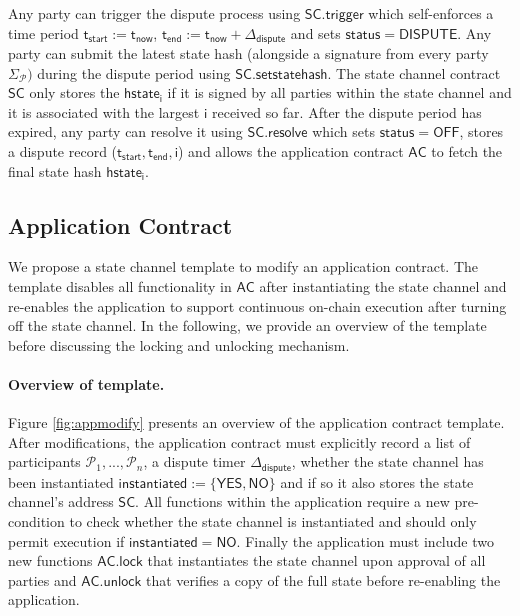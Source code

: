 \documentclass{llncs}
\newcommand{\instantiated}{\mathsf{instantiated}}
\newcommand{\instantiatedno}{\mathsf{NO}}
\newcommand{\instantiatedyes}{\mathsf{YES}}
\newcommand{\chanstatus}{\mathsf{status}}
\newcommand{\chandispute}{\mathsf{DISPUTE}}
\newcommand{\chanoff}{\mathsf{OFF}}
\newcommand{\hstatei}{\mathsf{hstate}_{\monotoniccounter}}
\newcommand{\monotoniccounter}{\mathsf{i}}
\newcommand{\participant}{\mathcal{P}}
\newcommand{\statechannel}{\mathsf{SC}}
\newcommand{\statechanneldispute}{\mathsf{SC}.\mathsf{trigger}}
\newcommand{\statechannelsetstate}{\mathsf{SC}.\mathsf{setstatehash}}
\newcommand{\statechannelresolve}{\mathsf{SC}.\mathsf{resolve}}
\newcommand{\appcontract}{\mathsf{AC}}
\newcommand{\applock}{\mathsf{AC.lock}}
\newcommand{\appunlock}{\mathsf{AC.unlock}}
\newcommand{\timerdispute}{\mathsf{\Delta}_{\mathsf{dispute}}}
\newcommand{\timenow}{\mathsf{t}_{\mathsf{now}}}
\newcommand{\timestart}{\mathsf{t}_{\mathsf{start}}}
\newcommand{\timeend}{\mathsf{t}_{\mathsf{end}}}
\newcommand{\timedispute}{\timenow + \mathsf{\Delta}_{\mathsf{dispute}}}
\begin{document}
Any party can trigger the dispute process using $\statechanneldispute$ which self-enforces a time period $\timestart := \timenow$, $\timeend := \timedispute$ and sets $\chanstatus = \chandispute$. 
Any party can submit the latest state hash (alongside a signature from every party $\Sigma_{\participant})$ during the dispute period using $\statechannelsetstate$. 
The state channel contract $\statechannel$ only stores the $\hstatei$ if it is  signed by all parties within the state channel and it is  associated with the largest $\monotoniccounter$ received so far. 
After the dispute period has expired, any party can resolve it using $\statechannelresolve$ which sets $\chanstatus = \chanoff$, stores a dispute record ($\timestart,\timeend, \monotoniccounter$) and allows the application contract $\appcontract$ to fetch the final state hash $\hstatei$. 

\subsection{Application Contract}

We propose a state channel template to modify an application contract. 
The template disables all functionality in $\appcontract$  after instantiating the state channel and re-enables the application to support continuous on-chain execution after turning off the state channel. 
In the following, we provide an overview of the template before discussing the locking and unlocking mechanism. 


\paragraph{Overview of template. } \label{sec:template} 
Figure \ref{fig:appmodify} presents an overview of the application contract template.
After modifications, the application contract must explicitly record a list of participants $\participant_{1},...,\participant_{n}$, a dispute timer $\timerdispute$, whether the state channel has been instantiated  $\instantiated := \{\instantiatedyes, \instantiatedno\}$ and if so it also stores the state channel's address  $\statechannel$. 
All functions within the application require a new pre-condition to check whether the state channel is instantiated and should only permit execution if $\instantiated = \instantiatedno$. 
Finally the application must include two new functions $\applock$ that instantiates the state channel upon approval of all parties and $\appunlock$ that verifies a copy of the full state before re-enabling the application. 
\end{document}

